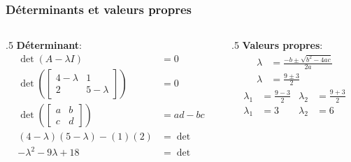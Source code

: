 \begin{frame}
    \frametitle{Déterminants et valeurs propres}
		\begin{columns}[t]

		\begin{column}{.5\linewidth}
		\textbf{Déterminant}:
			\footnotesize{\begin{align}
			\det(A-\lambda I)&=0 \\
        \det\left(
        \begin{bmatrix}
            4-\lambda&1\\
            2&5-\lambda
        \end{bmatrix}
        \right)&=0 \\
        \det\left(
            \begin{bmatrix}
                a&b\\
                c&d
            \end{bmatrix}
        \right)
				&=
        ad-bc \\
				(4-\lambda)(5-\lambda)-(1)(2) &= \det\\
				-\lambda^2-9\lambda+18 &= \det
			\end{align}}

		\end{column}
		\begin{column}{.5\linewidth}
		\textbf{Valeurs propres}:
			\footnotesize{
				\begin{align}
				\lambda   &= \frac{-b\pm\sqrt{b^2-4ac}}{2a} \\
				\lambda   &= \frac{9\pm3}{2}
				\end{align}
				\begin{align}
				\lambda_1 &= \frac{9-3}{2} & \lambda_2 &= \frac{9+3}{2} \\
				\lambda_1 &= 3             & \lambda_2 &= 6
			\end{align}}

		\end{column}
	\end{columns}
\end{frame}


